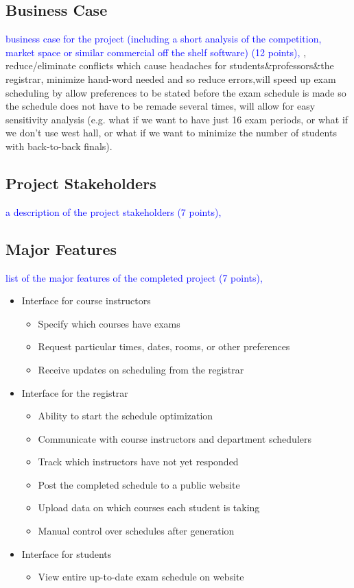 \documentclass[11pt]{article}
\begin{document}
\subsection{Business Case} %
\textcolor{blue}{ business case for the project (including a short analysis of the
 competition, market space or similar commercial off the shelf software) (12 points),}
, reduce/eliminate conflicts which cause headaches for students\&professors\&the registrar, minimize hand-word needed and so reduce errors,will speed up exam scheduling by allow preferences to be stated before the exam schedule is made so the schedule does not have to be remade several times, will allow for easy sensitivity analysis (e.g. what if we want to have just 16 exam periods, or what if we don't use west hall, or what if we want to minimize the number of students with back-to-back finals).
\subsection{Project Stakeholders} %
\textcolor{blue}{a description of the project stakeholders (7 points),}
\subsection{Major Features} %
\textcolor{blue}{ list of the major features of the completed project (7 points),}
\begin{itemize}
\item Interface for course instructors
  \begin{itemize}
  \item Specify which courses have exams
  \item Request particular times, dates, rooms, or other preferences
  \item Receive updates on scheduling from the registrar
  \end{itemize}
\item Interface for the registrar
  \begin{itemize}
  \item Ability to start the schedule optimization
  \item Communicate with course instructors and department schedulers
  \item Track which instructors have not yet responded
  \item Post the completed schedule to a public website
  \item Upload data on which courses each student is taking %
  \item Manual control over schedules after generation
  \end{itemize}
\item Interface for students
  \begin{itemize}
  \item View entire up-to-date exam schedule on website
  \end{itemize}
\end{itemize}
\end{document}
